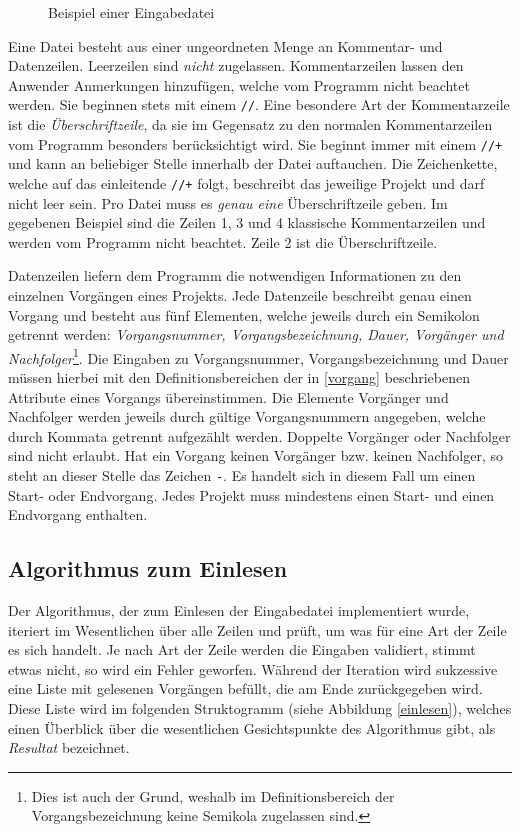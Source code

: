 \begin{figure}[h!]
  \resizebox{\textwidth}{!}{
    \fbox{
      \setlength{\fboxrule}{1pt}
      
    }
  }
  \caption{Beispiel einer Eingabedatei}
\end{figure}
Eine Datei besteht aus einer ungeordneten Menge an Kommentar- und
Datenzeilen. Leerzeilen sind \textit{nicht}
zugelassen. Kommentarzeilen lassen den Anwender Anmerkungen
hinzuf\"ugen, welche vom Programm nicht beachtet werden. Sie beginnen
stets mit einem \texttt{//}. Eine besondere Art der Kommentarzeile ist
die \textit{\"Uberschriftzeile}, da sie im Gegensatz zu den normalen
Kommentarzeilen vom Programm besonders ber\"ucksichtigt wird. Sie
beginnt immer mit einem \texttt{//+} und kann an beliebiger Stelle
innerhalb der Datei auftauchen. Die Zeichenkette, welche auf das
einleitende \texttt{//+} folgt, beschreibt das jeweilige Projekt und
darf nicht leer sein. Pro Datei muss es \textit{genau eine}
\"Uberschriftzeile geben. Im gegebenen Beispiel sind die Zeilen 1, 3
und 4 klassische Kommentarzeilen und werden vom Programm nicht
beachtet. Zeile 2 ist die \"Uberschriftzeile.

Datenzeilen liefern dem Programm die notwendigen Informationen zu den
einzelnen Vorg\"angen eines Projekts. Jede Datenzeile beschreibt genau
einen Vorgang und besteht aus f\"unf Elementen, welche jeweils durch
ein Semikolon getrennt werden: \textit{Vorgangsnummer,
  Vorgangsbezeichnung, Dauer, Vorg\"anger und
  Nachfolger}\footnote{Dies ist auch der Grund, weshalb im
  Definitionsbereich der Vorgangsbezeichnung keine Semikola zugelassen
  sind.}.
Die Eingaben zu Vorgangsnummer, Vorgangsbezeichnung und Dauer m\"ussen
hierbei mit den Definitionsbereichen der in \ref{vorgang} beschriebenen Attribute
eines Vorgangs \"ubereinstimmen. Die Elemente Vorg\"anger und
Nachfolger werden jeweils durch g\"ultige Vorgangsnummern angegeben,
welche durch Kommata getrennt aufgez\"ahlt werden. Doppelte
Vorg\"anger oder Nachfolger sind nicht erlaubt. Hat ein Vorgang
keinen Vorg\"anger bzw. keinen Nachfolger, so steht an dieser Stelle
das Zeichen \texttt{-}. Es handelt sich in diesem Fall um einen Start-
oder Endvorgang. Jedes Projekt muss mindestens einen Start- und einen
Endvorgang enthalten.

\subsection{Algorithmus zum Einlesen}

Der Algorithmus, der zum Einlesen der Eingabedatei implementiert
wurde, iteriert im Wesentlichen \"uber alle Zeilen und pr\"uft, um was
f\"ur eine Art der Zeile es sich handelt. Je nach Art der Zeile werden
die Eingaben validiert, stimmt etwas nicht, so wird ein Fehler
geworfen. W\"ahrend der Iteration wird sukzessive eine Liste mit
gelesenen Vorg\"angen bef\"ullt, die am Ende zur\"uckgegeben
wird. Diese Liste wird im folgenden Struktogramm (siehe Abbildung \ref{einlesen}), welches einen
\"Uberblick \"uber die wesentlichen Gesichtspunkte des Algorithmus
gibt, als \textit{Resultat} bezeichnet.

